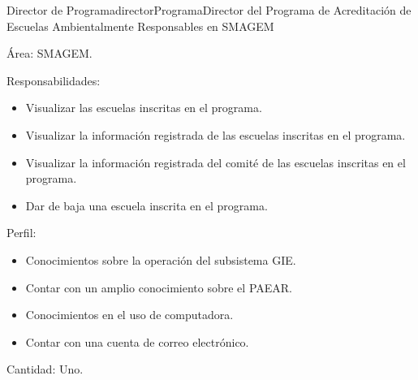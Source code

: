 \begin{actor}{Director de Programa}{directorPrograma}{Director del Programa de Acreditación de Escuelas Ambientalmente Responsables en SMAGEM}
    \item[Área:] SMAGEM.
    \item[Responsabilidades:] \hspace{1pt}
    \begin{itemize}
	\item Visualizar las escuelas inscritas en el programa.
	\item Visualizar la información registrada de las escuelas inscritas en el programa.
	\item Visualizar la información registrada del comité de las escuelas inscritas en el programa.
	\item Dar de baja una escuela inscrita en el programa.
    \end{itemize}
    \item[Perfil:] \hspace{1pt}
    \begin{itemize}
	\item Conocimientos sobre la operación del subsistema GIE.
	\item Contar con un amplio conocimiento sobre el PAEAR.
	\item Conocimientos en el uso de computadora.
	\item Contar con una cuenta de correo electrónico.
    \end{itemize}
    \item[Cantidad:] Uno.
\end{actor}

